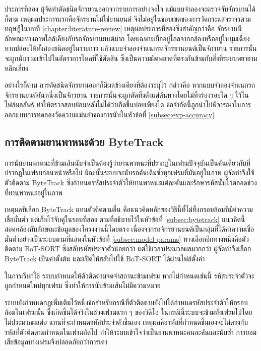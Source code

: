 ประการที่สอง ผู้จัดทำตัดชนิดจักรยานออกจากรายการอย่างจงใจ แม้แบบจำลองจะตรวจจับจักรยานได้ก็ตาม  เหตุผลประการแรกคือจักรยานไม่ใช่ยานยนต์ จึงไม่อยู่ในขอบเขตของการวัดกระแสจราจรตามทฤษฎีในบทที่ \ref{chapter:literature-review}  เหตุผลประการที่สองซึ่งสำคัญกว่าคือ จักรยานมีลักษณะทางภาพใกล้เคียงกับรถจักรยานยนต์มาก โดยเฉพาะเมื่ออยู่ไกลจากกล้องหรืออยู่ในมุมเฉียง หากปล่อยให้ทั้งสองชนิดอยู่ในรายการ แล้วแบบจำลองจำแนกรถจักรยานยนต์เป็นจักรยาน รายการนั้นจะถูกนับรวมเข้าไปในอัตราการไหลที่ใช้ตัดสิน ซึ่งเป็นความผิดพลาดที่ตรงกันข้ามกับสิ่งที่ระบบพยายามหลีกเลี่ยง

อย่างไรก็ตาม การตัดชนิดจักรยานออกก็มีผลข้างเคียงที่ต้องระบุไว้ กล่าวคือ หากแบบจำลองจำแนกรถจักรยานยนต์คันหนึ่งเป็นจักรยาน รายการนั้นจะถูกตัดทิ้งตั้งแต่ต้นทางโดยไม่ทิ้งร่องรอยใด ๆ ไว้ในไฟล์ผลลัพธ์ ทำให้ตรวจสอบย้อนหลังไม่ได้ว่าเกิดขึ้นบ่อยเพียงใด ข้อจำกัดนี้ถูกนำไปพิจารณาในการออกแบบการทดลองวัดความแม่นยำของการนับในหัวข้อที่ \ref{subsec:exp-accuracy}

\subsection{การติดตามยานพาหนะด้วย ByteTrack}
\label{subsec:tracking}

การนับยานพาหนะที่ข้ามเส้นนับจำเป็นต้องรู้ว่ายานพาหนะที่ปรากฏในเฟรมปัจจุบันเป็นคันเดียวกับที่ปรากฏในเฟรมก่อนหน้าหรือไม่ มิฉะนั้นระบบจะนับรถคันเดิมซ้ำทุกเฟรมที่มันอยู่ในภาพ ผู้จัดทำจึงใช้ตัวติดตาม ByteTrack ซึ่งกำหนดรหัสประจำตัวให้ยานพาหนะแต่ละคันและรักษารหัสนั้นไว้ตลอดช่วงที่ยานพาหนะอยู่ในภาพ

เหตุผลที่เลือก ByteTrack แทนตัวติดตามอื่น คือแนวคิดหลักของวิธีนี้ที่ไม่ทิ้งกรอบล้อมที่มีค่าความเชื่อมั่นต่ำ แต่เก็บไว้จับคู่ในรอบที่สอง ตามที่อธิบายไว้ในหัวข้อที่ \ref{subsec:bytetrack}  แนวคิดนี้สอดคล้องกับลักษณะข้อมูลของโครงงานนี้โดยตรง เนื่องจากรถจักรยานยนต์เป็นกลุ่มที่ได้ค่าความเชื่อมั่นต่ำอย่างเป็นระบบตามที่แสดงในหัวข้อที่ \ref{subsec:model-params}  ทางเลือกอีกทางหนึ่งคือตัวติดตาม BoT-SORT ซึ่งสลับรหัสประจำตัวน้อยกว่า แต่ใช้เวลาประมวลผลมากกว่า ผู้จัดทำจึงเลือก ByteTrack เป็นค่าตั้งต้น และเปิดให้สลับไปใช้ BoT-SORT ได้ผ่านไฟล์ตั้งค่า

ในการเรียกใช้ ระบบกำหนดให้ตัวติดตามจดจำสถานะข้ามเฟรม หากไม่กำหนดเช่นนี้ รหัสประจำตัวจะถูกกำหนดใหม่ทุกเฟรม ซึ่งทำให้การนับข้ามเส้นไม่มีความหมาย

ระบบยังกำหนดกฎเพิ่มเติมไว้หนึ่งข้อสำหรับกรณีที่ตัวติดตามยังไม่ได้กำหนดรหัสประจำตัวให้กรอบล้อมในเฟรมนั้น ซึ่งเกิดขึ้นได้จริงในช่วงเฟรมแรก ๆ ของวิดีโอ  ในกรณีนี้ระบบจะข้ามทั้งเฟรมไปโดยไม่ประมวลผลต่อ แทนที่จะกำหนดรหัสประจำตัวขึ้นเอง เหตุผลคือรหัสที่กำหนดขึ้นเองจะไม่ตรงกับรหัสที่ตัวติดตามกำหนดในเฟรมถัดไป ทำให้ระบบเข้าใจว่าเป็นยานพาหนะคนละคันและนับซ้ำ การยอมเสียข้อมูลบางเฟรมจึงปลอดภัยกว่าการเดา

